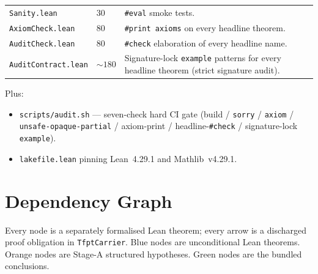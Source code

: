 \documentclass[11pt,a4paper]{article}
\begin{document}
\begin{center}
\begin{tabularx}{0.98\textwidth}{@{}p{}p{}Y@{}}
\texttt{Sanity.lean}              & $30$      & \texttt{\#eval} smoke tests. \\
\texttt{AxiomCheck.lean}          & $80$      & \texttt{\#print axioms} on every headline theorem. \\
\texttt{AuditCheck.lean}          & $80$      & \texttt{\#check} elaboration of every headline name. \\
\texttt{AuditContract.lean}       & $\sim180$ & Signature-lock \texttt{example} patterns for every headline theorem (strict signature audit). \\
\bottomrule
\end{tabularx}
\end{center}

Plus:
\begin{itemize}[leftmargin=1.5em, itemsep=1pt]
\item \texttt{scripts/audit.sh} --- seven-check hard CI gate
      (build / \texttt{sorry} / \texttt{axiom} /
      \texttt{unsafe-opaque-partial} / axiom-print /
      headline-\texttt{\#check} / signature-lock \texttt{example}).
\item \texttt{lakefile.lean} pinning Lean~4.29.1 and Mathlib~v4.29.1.
\end{itemize}

\section{Dependency Graph}
\label{sec:graph}

Every node is a separately formalised Lean theorem; every arrow
is a discharged proof obligation in \texttt{TfptCarrier}. Blue
nodes are unconditional Lean theorems. Orange nodes are Stage-A
structured hypotheses. Green nodes are the bundled conclusions.
\end{document}

